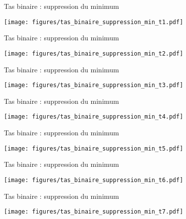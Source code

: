 \documentclass[handout]{beamer}
\begin{document}
\begin{frame}[fragile]{Tas binaire : suppression du minimum}
	\begin{center}
		\texttt{[image: figures/tas\_binaire\_suppression\_min\_t1.pdf]}
	\end{center}
\end{frame}

\begin{frame}[fragile]{Tas binaire : suppression du minimum}
	\begin{center}
		\texttt{[image: figures/tas\_binaire\_suppression\_min\_t2.pdf]}
	\end{center}
\end{frame}

\begin{frame}[fragile]{Tas binaire : suppression du minimum}
	\begin{center}
		\texttt{[image: figures/tas\_binaire\_suppression\_min\_t3.pdf]}
	\end{center}
\end{frame}

\begin{frame}[fragile]{Tas binaire : suppression du minimum}
	\begin{center}
		\texttt{[image: figures/tas\_binaire\_suppression\_min\_t4.pdf]}
	\end{center}
\end{frame}

\begin{frame}[fragile]{Tas binaire : suppression du minimum}
	\begin{center}
		\texttt{[image: figures/tas\_binaire\_suppression\_min\_t5.pdf]}
	\end{center}
\end{frame}

\begin{frame}[fragile]{Tas binaire : suppression du minimum}
	\begin{center}
		\texttt{[image: figures/tas\_binaire\_suppression\_min\_t6.pdf]}
	\end{center}
\end{frame}

\begin{frame}[fragile]{Tas binaire : suppression du minimum}
	\begin{center}
		\texttt{[image: figures/tas\_binaire\_suppression\_min\_t7.pdf]}
	\end{center}
\end{frame}
\end{document}
